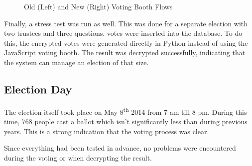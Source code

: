 \begin{figure}
  \centering
  \begin{minipage}{.45\linewidth}
    \centering
    \scalebox{.7}{}
  \end{minipage}
  \quad
  \begin{minipage}{.45\linewidth}
    \centering
    \scalebox{.7}{}
  \end{minipage}
  \caption{Old (Left) and New (Right) Voting Booth Flows}
  \label{fig:be:voting_booth_flows}
\end{figure}

\par Finally, a stress test was run as well. This was done for a separate election with two trustees and three questions.  votes were inserted into the database. To do this, the encrypted votes were generated directly in Python instead of using the JavaScript voting booth. The result was decrypted successfully, indicating that the system can manage an election of that size.

\subsection{Election Day}

The election itself took place on May 8\textsuperscript{th} 2014 from 7 am till 8 pm. During this time, 768 people cast a ballot which isn't significantly less than during previous years. This is a strong indication that the voting process was clear.

\par Since everything had been tested in advance, no problems were encountered during the voting or when decrypting the result.
